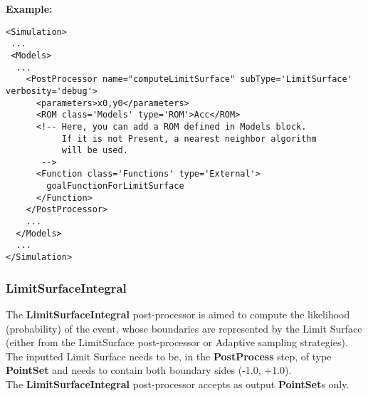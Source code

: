 \textbf{Example:}
\begin{lstlisting}[style=XML,morekeywords={name,subType,debug,class,type}]
<Simulation>
 ...
 <Models>
  ...
    <PostProcessor name="computeLimitSurface" subType='LimitSurface' verbosity='debug'>
      <parameters>x0,y0</parameters>
      <ROM class='Models' type='ROM'>Acc</ROM>
      <!-- Here, you can add a ROM defined in Models block.
           If it is not Present, a nearest neighbor algorithm
           will be used.
       -->
      <Function class='Functions' type='External'>
        goalFunctionForLimitSurface
      </Function>
    </PostProcessor>
    ...
  </Models>
  ...
</Simulation>
\end{lstlisting}


\subsubsection{LimitSurfaceIntegral}
\label{LimitSurfaceIntegral}
The \textbf{LimitSurfaceIntegral} post-processor is aimed to compute the likelihood (probability) of the event, whose boundaries are
represented by the Limit Surface (either from the LimitSurface post-processor or Adaptive sampling strategies).
The inputted Limit Surface needs to be, in the  \textbf{PostProcess} step, of type  \textbf{PointSet} and needs to contain
both boundary sides (-1.0, +1.0).
\\ The \textbf{LimitSurfaceIntegral} post-processor accepts as output  \textbf{PointSet}s only.

